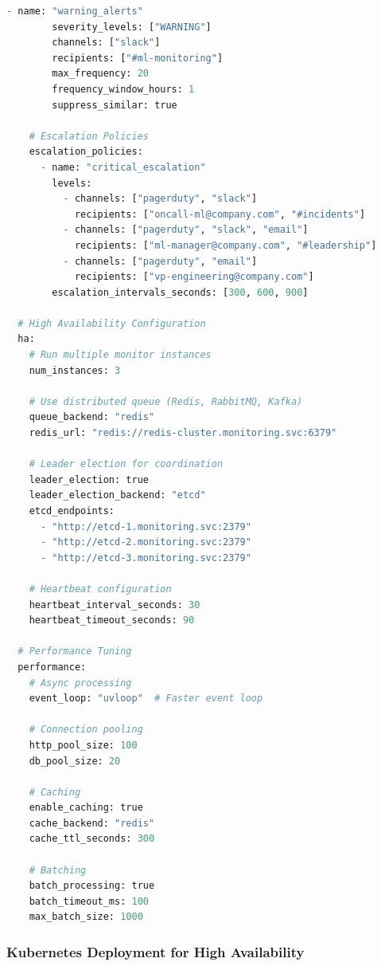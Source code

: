 \begin{lstlisting}[language=Python, caption={Production Monitoring Configuration}]
      - name: "warning_alerts"
        severity_levels: ["WARNING"]
        channels: ["slack"]
        recipients: ["#ml-monitoring"]
        max_frequency: 20
        frequency_window_hours: 1
        suppress_similar: true

    # Escalation Policies
    escalation_policies:
      - name: "critical_escalation"
        levels:
          - channels: ["pagerduty", "slack"]
            recipients: ["oncall-ml@company.com", "#incidents"]
          - channels: ["pagerduty", "slack", "email"]
            recipients: ["ml-manager@company.com", "#leadership"]
          - channels: ["pagerduty", "email"]
            recipients: ["vp-engineering@company.com"]
        escalation_intervals_seconds: [300, 600, 900]

  # High Availability Configuration
  ha:
    # Run multiple monitor instances
    num_instances: 3

    # Use distributed queue (Redis, RabbitMQ, Kafka)
    queue_backend: "redis"
    redis_url: "redis://redis-cluster.monitoring.svc:6379"

    # Leader election for coordination
    leader_election: true
    leader_election_backend: "etcd"
    etcd_endpoints:
      - "http://etcd-1.monitoring.svc:2379"
      - "http://etcd-2.monitoring.svc:2379"
      - "http://etcd-3.monitoring.svc:2379"

    # Heartbeat configuration
    heartbeat_interval_seconds: 30
    heartbeat_timeout_seconds: 90

  # Performance Tuning
  performance:
    # Async processing
    event_loop: "uvloop"  # Faster event loop

    # Connection pooling
    http_pool_size: 100
    db_pool_size: 20

    # Caching
    enable_caching: true
    cache_backend: "redis"
    cache_ttl_seconds: 300

    # Batching
    batch_processing: true
    batch_timeout_ms: 100
    max_batch_size: 1000
\end{lstlisting}

\subsubsection{Kubernetes Deployment for High Availability}

